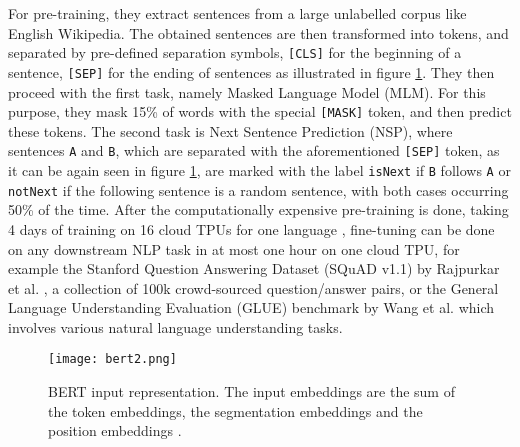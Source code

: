 For pre-training, they extract sentences from a large unlabelled corpus like English Wikipedia. The obtained sentences are then transformed into tokens, and separated by pre-defined separation symbols, \verb![CLS]! for the beginning of a sentence, \verb![SEP]! for the ending of sentences as illustrated in figure \ref{fig:bert}. They then proceed with the first task, namely Masked Language Model (MLM). For this purpose, they mask 15\% of words with the special \verb![MASK]! token, and then predict these tokens. The second task is Next Sentence Prediction (NSP), where sentences \verb!A! and \verb!B!, which are separated with the aforementioned \verb![SEP]! token, as it can be again seen in figure \ref{fig:bert}, are marked with the label \verb!isNext! if \verb!B! follows \verb!A! or \verb!notNext! if the following sentence is a random sentence, with both cases occurring 50\% of the time. After the computationally expensive pre-training is done, taking 4 days of training on 16 cloud TPUs for one language \cite{googlebert}, fine-tuning can be done on any downstream NLP task in at most one hour on one cloud TPU, for example the Stanford Question Answering Dataset (SQuAD v1.1) by Rajpurkar et al. \cite{rajpurkar2016squad}, a collection of 100k crowd-sourced question/answer pairs, or the General Language Understanding Evaluation (GLUE) benchmark by Wang et al. \cite{wang2018glue} which involves various natural language understanding tasks. 


\begin{figure}[h]
  \centering
  \texttt{[image: bert2.png]}\\
  \caption{BERT input representation. The input embeddings are the sum of the token embeddings, the segmentation embeddings and the position embeddings \cite{devlin2018bert}.}
  \label{fig:bert}
\end{figure}


\begin{comment}
\begin{figure}[h]
  \centering
  \texttt{[image: bert.png]}\\
  \caption{Bert}
  \label{fig:bert}
\end{figure}
\end{comment}

